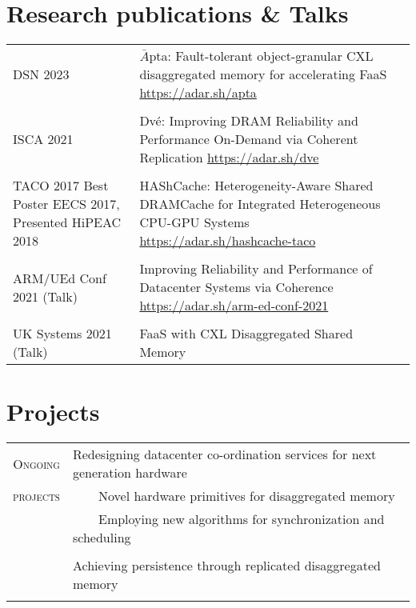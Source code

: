 \documentclass[a4paper,10pt]{article} %
\newcommand{\tabitem}{~~\llap{\textbullet}~~}
\begin{document}
\section{Research publications \& Talks}
\begin{tabular}{p{3cm}p{11cm}}
DSN 2023 &  $\bar{A}$pta: Fault-tolerant object-granular CXL disaggregated memory for \newline accelerating FaaS \hfill \href{https://adar.sh/apta}{https://adar.sh/apta}\\
& \\
ISCA 2021 & Dv\'e: Improving DRAM Reliability and Performance On-Demand via \newline Coherent Replication \hfill  \href{https://adar.sh/dve}{https://adar.sh/dve}\\
&\\
TACO 2017 \newline \footnotesize{Best Poster EECS 2017, Presented HiPEAC 2018} & HAShCache: Heterogeneity-Aware Shared DRAMCache for Integrated Heterogeneous CPU-GPU Systems  \hfill
\href{https://adar.sh/hashcache-taco}{https://adar.sh/hashcache-taco}\\
&\\
ARM/UEd Conf 2021 \footnotesize{(Talk)} & Improving Reliability and Performance of Datacenter Systems via \newline Coherence \hfill  \href{https://adar.sh/arm-ed-conf-2021}{https://adar.sh/arm-ed-conf-2021}\\	
&\\
UK Systems 2021 \footnotesize{(Talk)} & FaaS with CXL Disaggregated Shared Memory
\end{tabular}

\section{Projects}

\begin{tabular}{rp{12cm}}
	\textsc{Ongoing } & Redesigning datacenter co-ordination services for next generation hardware \\
	\textsc{projects} & \tabitem Novel hardware primitives for disaggregated memory \\
	& \tabitem Employing new algorithms for synchronization and scheduling \\
	& \\
	& Achieving persistence through replicated disaggregated memory \\
	& \\
\end{tabular}
\end{document}
